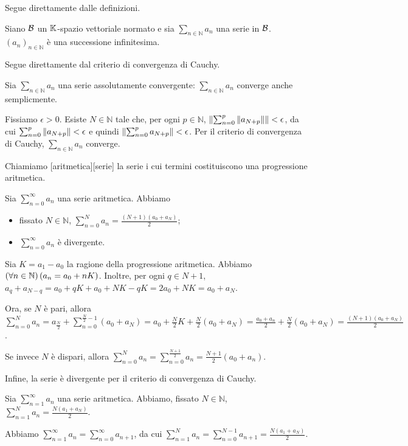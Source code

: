 \Proof Segue direttamente dalle definizioni. \EndProof
\begin{Corollary}
	Siano $\mathcal{B}$ un $\mathbb{K}$-spazio vettoriale normato e sia $\sum_{n \in \mathbb{N}} a_n$ una serie in $\mathcal{B}$. $(a_n)_{n \in \mathbb{N}}$ \`e una successione infinitesima.
\end{Corollary}
\Proof Segue direttamente dal criterio di convergenza di Cauchy. \EndProof
\begin{Corollary}
	Sia $\sum_{n \in \mathbb{N}} a_n$ una serie assolutamente convergente: $\sum_{n \in \mathbb{N}} a_n$ converge anche semplicmente.
\end{Corollary}
\Proof Fissiamo $\epsilon > 0$. Esiste $N \in \mathbb{N}$ tale che, per ogni $p \in \mathbb{N}$, $\Norm{\sum_{n = 0}^p \Norm{a_{N + p}}} < \epsilon$, da cui $\sum_{n = 0}^p \Norm{a_{N + p}} < \epsilon$ e quindi $\Norm{\sum_{n = 0}^p a_{N + p}} < \epsilon$. Per il criterio di convergenza di Cauchy, $\sum_{n \in \mathbb{N}} a_n$ converge. \EndProof
\begin{Definition}
	Chiamiamo [aritmetica][serie] la serie i cui termini costituiscono una progressione aritmetica.
\end{Definition}
\begin{Theorem}
	Sia $\sum_{n = 0}^\infty a_n$ una serie aritmetica. Abbiamo
	\begin{itemize}
		\item fissato $N \in \mathbb{N}$, $\sum_{n = 0}^N a_n = \frac{(N + 1)(a_0 + a_N)}{2}$;
		\item $\sum_{n = 0}^\infty a_n$ \`e divergente.
	\end{itemize}
\end{Theorem}
\Proof Sia $K = a_1 - a_0$ la ragione della progressione aritmetica. Abbiamo $\left ( \forall n \in \mathbb{N} \right ) \left ( a_n = a_0 + nK \right )$. Inoltre, per ogni $q \in N + 1$, $a_q + a_{N - q} = a_0 + qK + a_0 + NK - qK = 2 a_0 + NK = a_0 + a_N$.
\par Ora, se $N$ \`e pari, allora $\sum_{n = 0}^N a_n = a_{\frac{N}{2}} + \sum_{n = 0}^{\frac{N}{2} - 1} (a_0 + a_N) = a_0 + \frac{N}{2}K + \frac{N}{2} (a_0 + a_N) = \frac{a_0 + a_n}{2} + \frac{N}{2}(a_0 + a_N) = \frac{(N + 1)(a_0 + a_N)}{2}$.
\par Se invece $N$ \`e dispari, allora $\sum_{n = 0}^N a_n = \sum_{n = 0}^{\frac{N + 1}{2}} a_n = \frac{N + 1}{2}(a_0 + a_n)$.
\par Infine, la serie \`e divergente per il criterio di convergenza di Cauchy. \EndProof
\begin{Corollary}
	Sia $\sum_{n = 1}^\infty a_n$ una serie aritmetica. Abbiamo, fissato $N \in \mathbb{N}$, $\sum_{n = 1}^N a_n = \frac{N(a_1 + a_N)}{2}$.
\end{Corollary}
\Proof Abbiamo $\sum_{n = 1}^\infty a_n = \sum_{n = 0}^\infty a_{n + 1}$, da cui $\sum_{n = 1}^N a_n = \sum_{n = 0}^{N - 1} a_{n + 1} = \frac{N(a_1 + a_N)}{2}$. \EndProof
